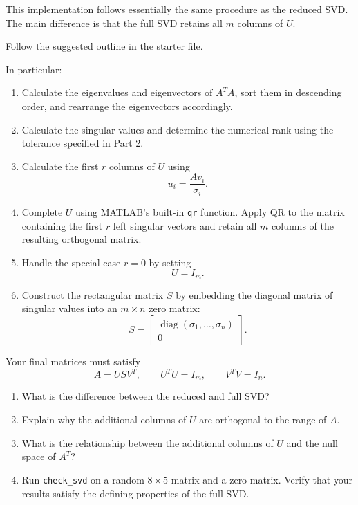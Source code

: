 \documentclass{ximera}
\begin{document}
This implementation follows essentially the same procedure as
the reduced SVD. The main difference is that the full SVD retains
all $m$ columns of $U$.

Follow the suggested outline in the starter file.

In particular:

\begin{enumerate}
    \item Calculate the eigenvalues and eigenvectors of $A^TA$,
    sort them in descending order, and rearrange the eigenvectors
    accordingly.

    \item Calculate the singular values and determine the
    numerical rank using the tolerance specified in Part 2.

    \item Calculate the first $r$ columns of $U$ using
    \[
    u_i=\frac{Av_i}{\sigma_i}.
    \]

    \item Complete $U$ using MATLAB's built-in \texttt{qr} function.
    Apply QR to the matrix containing the first $r$ left singular
    vectors and retain all $m$ columns of the resulting
    orthogonal matrix.

    \item Handle the special case $r=0$ by setting
    \[
    U=I_m.
    \]

    \item Construct the rectangular matrix $S$ by embedding
    the diagonal matrix of singular values into an $m\times n$
    zero matrix:
    \[
    S=
    \begin{bmatrix}
    \operatorname{diag}(\sigma_1,\ldots,\sigma_n)\\
    0
    \end{bmatrix}.
    \]
\end{enumerate}

Your final matrices must satisfy
\[
A=USV^T,\qquad U^TU=I_m,\qquad V^TV=I_n.
\]

\begin{exercise}

\begin{enumerate}
    \item What is the difference between the reduced and full SVD?

    \item Explain why the additional columns of $U$ are
    orthogonal to the range of $A$.

    \item What is the relationship between the additional
    columns of $U$ and the null space of $A^T$?

    \item Run \texttt{check\_svd} on a random $8\times5$ matrix
    and a zero matrix. Verify that your results satisfy the
    defining properties of the full SVD.
\end{enumerate}

\end{exercise}
\end{document}
